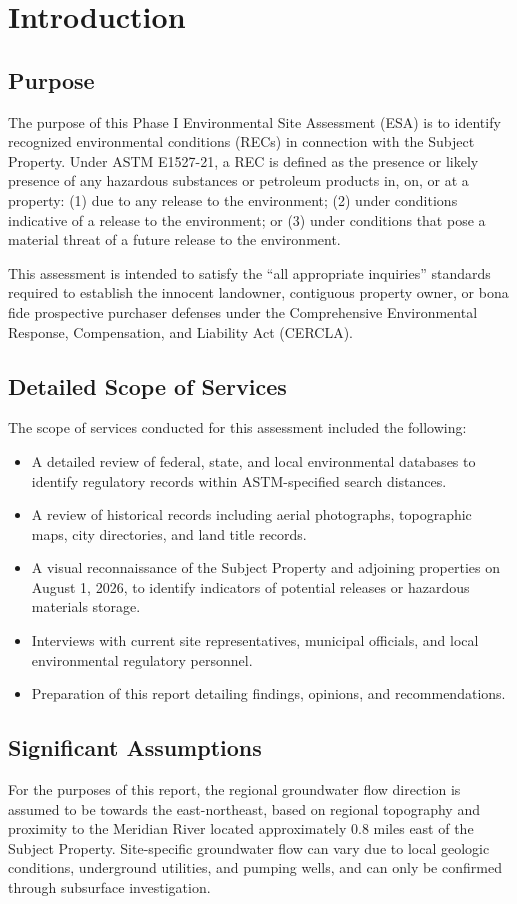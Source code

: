 \section{Introduction}

\subsection{Purpose}
The purpose of this Phase I Environmental Site Assessment (ESA) is to identify recognized environmental conditions (RECs) in connection with the Subject Property. Under ASTM E1527-21, a REC is defined as the presence or likely presence of any hazardous substances or petroleum products in, on, or at a property: (1) due to any release to the environment; (2) under conditions indicative of a release to the environment; or (3) under conditions that pose a material threat of a future release to the environment.

This assessment is intended to satisfy the ``all appropriate inquiries'' standards required to establish the innocent landowner, contiguous property owner, or bona fide prospective purchaser defenses under the Comprehensive Environmental Response, Compensation, and Liability Act (CERCLA).

\subsection{Detailed Scope of Services}
The scope of services conducted for this assessment included the following:
\begin{itemize}
  \item A detailed review of federal, state, and local environmental databases to identify regulatory records within ASTM-specified search distances.
  \item A review of historical records including aerial photographs, topographic maps, city directories, and land title records.
  \item A visual reconnaissance of the Subject Property and adjoining properties on August 1, 2026, to identify indicators of potential releases or hazardous materials storage.
  \item Interviews with current site representatives, municipal officials, and local environmental regulatory personnel.
  \item Preparation of this report detailing findings, opinions, and recommendations.
\end{itemize}

\subsection{Significant Assumptions}
For the purposes of this report, the regional groundwater flow direction is assumed to be towards the east-northeast, based on regional topography and proximity to the Meridian River located approximately 0.8 miles east of the Subject Property. Site-specific groundwater flow can vary due to local geologic conditions, underground utilities, and pumping wells, and can only be confirmed through subsurface investigation.

